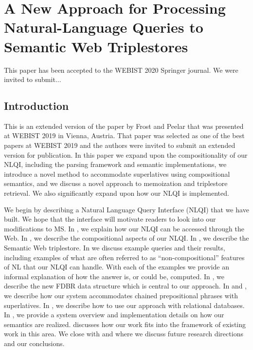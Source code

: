\documentclass[../main.tex]{subfiles}
\begin{document}
\chapter{A New Approach for Processing Natural-Language Queries to Semantic Web Triplestores}
\begin{refsection}

This paper has been accepted to the WEBIST 2020 Springer journal.
We were invited to submit... %

\label{chapter:webist2019journal}

\section{Introduction}
\label{webist2019journal:intro}
This is an extended version of the paper by Frost and Peelar \cite{frostpeelar2019} that was presented at WEBIST 2019 in Vienna, Austria.  That paper was selected as one of the best papers at WEBIST 2019 and the authors were invited to submit an extended version for publication.  In this paper we expand upon the compositionality of our NLQI, including the parsing framework and semantic implementations, we introduce a novel method to accommodate superlatives using compositional semantics, and we discuss a novel approach to memoization and triplestore retrieval.  We also significantly expand upon how our NLQI is implemented.

\noindent We begin by describing a Natural Language Query Interface (NLQI) that we have built. We hope that the interface will motivate readers to look into our modifications to MS. In , we explain how our NLQI can be accessed through the Web. In , we describe the compositional aspects of our NLQI.  In , we describe the Semantic Web triplestore. In  we discuss example queries and their results, including examples of what are often referred to as ``non-compositional'' features of NL that our NLQI can handle. With each of the examples we provide an informal explanation of how the answer is, or could be, computed. In , we describe the new FDBR data structure which is central to our approach. In  and , we describe how our system accommodates chained prepositional phrases with superlatives.  In , we describe how to use our approach with relational databases. In , we provide a system overview and implementation details on how our semantics are realized.  discusses how our work fits into the framework of existing work in this area.  We close with  and  where we discuss future research directions and our conclusions.


\end{refsection}
\end{document}
